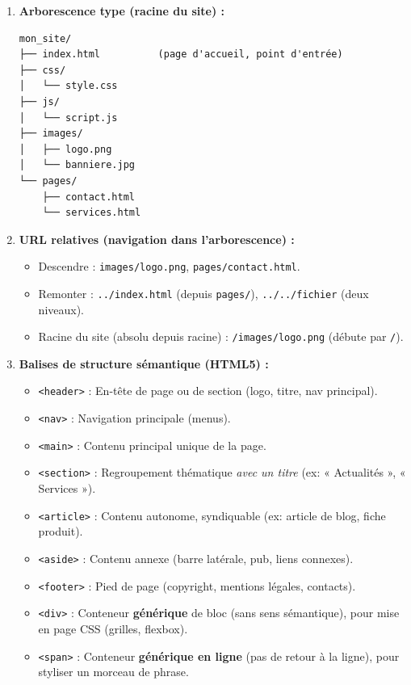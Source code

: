 \documentclass[11pt]{article}
\begin{document}
\begin{methode}
\begin{enumerate}
  \item \textbf{Arborescence type (racine du site) :}
\begin{verbatim}
mon_site/
├── index.html          (page d'accueil, point d'entrée)
├── css/
│   └── style.css
├── js/
│   └── script.js
├── images/
│   ├── logo.png
│   └── banniere.jpg
└── pages/
    ├── contact.html
    └── services.html
\end{verbatim}
  \item \textbf{URL relatives (navigation dans l'arborescence) :}
        \begin{itemize}
          \item Descendre : \texttt{images/logo.png}, \texttt{pages/contact.html}.
          \item Remonter : \texttt{../index.html} (depuis \texttt{pages/}), \texttt{../../fichier} (deux niveaux).
          \item Racine du site (absolu depuis racine) : \texttt{/images/logo.png} (débute par \texttt{/}).
        \end{itemize}
  \item \textbf{Balises de structure sémantique (HTML5) :}
        \begin{itemize}
          \item \texttt{<header>} : En-tête de page ou de section (logo, titre, nav principal).
          \item \texttt{<nav>} : Navigation principale (menus).
          \item \texttt{<main>} : Contenu principal unique de la page.
          \item \texttt{<section>} : Regroupement thématique \emph{avec un titre} (ex: « Actualités », « Services »).
          \item \texttt{<article>} : Contenu autonome, syndiquable (ex: article de blog, fiche produit).
          \item \texttt{<aside>} : Contenu annexe (barre latérale, pub, liens connexes).
          \item \texttt{<footer>} : Pied de page (copyright, mentions légales, contacts).
          \item \texttt{<div>} : Conteneur \textbf{générique} de bloc (sans sens sémantique), pour mise en page CSS (grilles, flexbox).
          \item \texttt{<span>} : Conteneur \textbf{générique en ligne} (pas de retour à la ligne), pour styliser un morceau de phrase.

\end{itemize}
\end{enumerate}
\end{methode}
\end{document}
